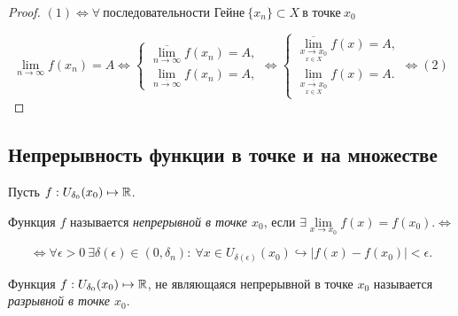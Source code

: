 \begin{proof}
    $(1) \Leftrightarrow \forall \ \textrm{последовательности Гейне} \ \{x_{n}\} \subset X \  \textrm{в точке}\  x_{0}$

    $$
    \lim\limits_{n \to \infty} f(x_{n}) = A  \Leftrightarrow 
    \begin{cases}
        \overline{\lim\limits_{n \to \infty}} f(x_{n}) = A, \\
        \lim\limits_{\overline{n \to \infty}} f(x_{n}) = A,
    \end{cases}
    \Leftrightarrow 
    \begin{cases}
        \overline{\lim\limits_{\underset{x \in X}{x\to x_0}}} f(x) = A, \\
        \lim\limits_{\overline{\underset{x \in X}{x\to x_0}}} f(x) = A.
    \end{cases}
    \Leftrightarrow (2)$$
\end{proof}

\subsection{Непрерывность функции в точке и на множестве}

\begin{definition}
    Пусть $f: U_{\delta_{0}}(x_{0}) \mapsto \mathbb{R}$.

    Функция $f$ называется \textit{непрерывной в точке $x_{0}$}, если $\exists \lim\limits_{x \to x_{0}} f(x) = f(x_{0}). \Leftrightarrow$

    $$\Leftrightarrow
     \forall \epsilon > 0 \ \exists \delta(\epsilon) \in (0, \delta_{n}): \ \forall x\in U_{\delta(\epsilon)}(x_{0}) \hookrightarrow |f(x) - f(x_{0})| < \epsilon.
    $$
\end{definition}

\begin{definition}
    Функция $f: U_{\delta_{0}}(x_{0}) \mapsto \mathbb{R}$, не являющаяся непрерывной в точке $x_0$ называется \textit{разрывной в точке $x_0$}.
\end{definition}

